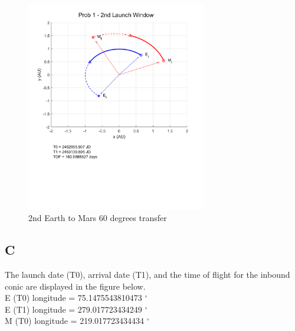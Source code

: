 \documentclass[conf]{new-aiaa}
\begin{document}
\begin{figure}[H]
    \centering 
    \includegraphics[width=0.7\textwidth]{Prob 1 - 2nd Launch Window.pdf}
    \caption{2nd Earth to Mars 60 degrees transfer}
\end{figure}

\subsection*{C}

The launch date (T0), arrival date (T1), and the time of flight for the inbound conic are displayed in the figure below. \\ 

E (T0) longitude = 75.1475543810473 $^\circ$ \\

E (T1) longitude = 279.017723434249 $^\circ$ \\

M (T0) longitude = 219.017723434434 $^\circ$ 
\end{document}
